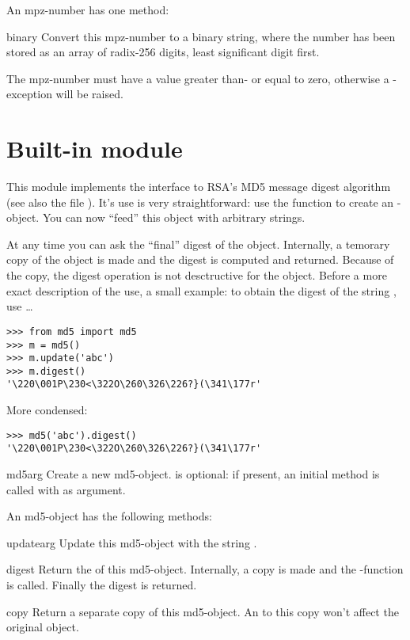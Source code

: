 An mpz-number has one method:

\renewcommand{\indexsubitem}{(mpz method)}
\begin{funcdesc}{binary}{}
  Convert this mpz-number to a binary string, where the number has been
  stored as an array of radix-256 digits, least significant digit first.

  The mpz-number must have a value greater than- or equal to zero,
  otherwise a -exception will be raised.
\end{funcdesc}

\section{Built-in module }

This module implements the interface to RSA's MD5 message digest
algorithm (see also the file ). It's use is very
straightforward: use the function  to create an
-object. You can now ``feed'' this object with arbitrary
strings.

At any time you can ask the ``final'' digest of the object. Internally,
a temorary copy of the object is made and the digest is computed and
returned. Because of the copy, the digest operation is not desctructive
for the object. Before a more exact description of the use, a small
example: to obtain the digest of the string , use \ldots

\bcode\begin{verbatim}
>>> from md5 import md5
>>> m = md5()
>>> m.update('abc')
>>> m.digest()
'\220\001P\230<\322O\260\326\226?}(\341\177r'
\end{verbatim}\ecode

More condensed:

\bcode\begin{verbatim}
>>> md5('abc').digest()
'\220\001P\230<\322O\260\326\226?}(\341\177r'
\end{verbatim}\ecode

\renewcommand{\indexsubitem}{(in module md5)}
\begin{funcdesc}{md5}{arg}
  Create a new md5-object.  is optional: if present, an initial
   method is called with  as argument.
\end{funcdesc}

An md5-object has the following methods:

\renewcommand{\indexsubitem}{(md5 method)}
\begin{funcdesc}{update}{arg}
  Update this md5-object with the string .
\end{funcdesc}

\begin{funcdesc}{digest}{}
  Return the  of this md5-object. Internally, a copy is made
  and the \C-function  is called. Finally the digest is
  returned.
\end{funcdesc}

\begin{funcdesc}{copy}{}
  Return a separate copy of this md5-object.  An  to this
  copy won't affect the original object.
\end{funcdesc}
